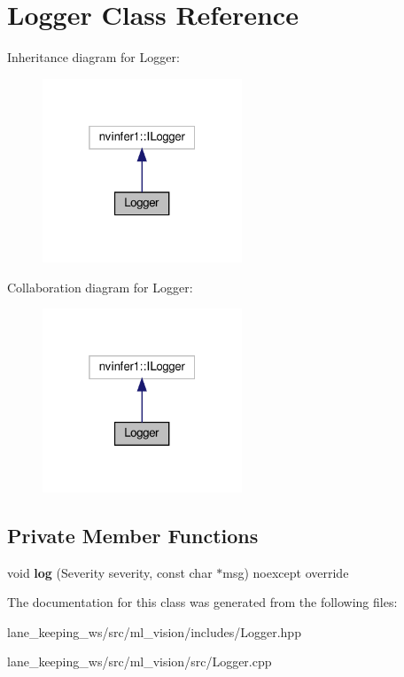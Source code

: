 \hypertarget{classLogger}{}\section{Logger Class Reference}
\label{classLogger}


Inheritance diagram for Logger\+:
\nopagebreak
\begin{figure}[H]
\begin{center}
\leavevmode
\includegraphics[width=169pt]{classLogger__inherit__graph}
\end{center}
\end{figure}


Collaboration diagram for Logger\+:
\nopagebreak
\begin{figure}[H]
\begin{center}
\leavevmode
\includegraphics[width=169pt]{classLogger__coll__graph}
\end{center}
\end{figure}
\subsection*{Private Member Functions}
\begin{DoxyCompactItemize}
\item 
\mbox{\label{classLogger_a2d536d8a8c1354c2ff1236efe6a395ff}} 
void {\bfseries log} (Severity severity, const char $\ast$msg) noexcept override
\end{DoxyCompactItemize}


The documentation for this class was generated from the following files\+:\begin{DoxyCompactItemize}
\item 
lane\+\_\+keeping\+\_\+ws/src/ml\+\_\+vision/includes/Logger.\+hpp\item 
lane\+\_\+keeping\+\_\+ws/src/ml\+\_\+vision/src/Logger.\+cpp\end{DoxyCompactItemize}
